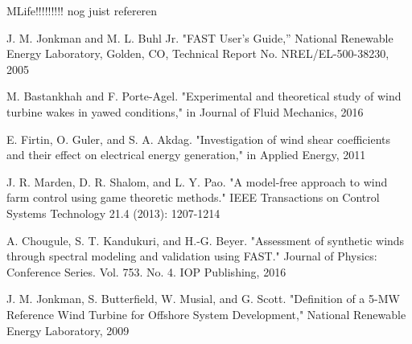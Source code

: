 \begin{thebibliography}{99}
 MLife!!!!!!!!! nog juist refereren

J. M. Jonkman and M. L. Buhl Jr. "FAST User's Guide,'' National Renewable Energy Laboratory, Golden, CO, Technical Report No. NREL/EL-500-38230, 2005

M. Bastankhah and F. Porte-Agel. "Experimental and theoretical study of wind turbine wakes in yawed conditions," in Journal of Fluid Mechanics, 2016

E. Firtin, O. Guler, and S. A. Akdag. "Investigation of wind shear coefficients and their effect on electrical energy generation," in Applied Energy, 2011

J. R. Marden, D. R. Shalom, and L. Y. Pao. "A model-free approach to wind farm control using game theoretic methods." IEEE Transactions on Control Systems Technology 21.4 (2013): 1207-1214	

A. Chougule, S. T. Kandukuri, and H.-G. Beyer. "Assessment of synthetic winds through spectral modeling and validation using FAST." Journal of Physics: Conference Series. Vol. 753. No. 4. IOP Publishing, 2016

J. M. Jonkman, S. Butterfield, W. Musial, and G. Scott. "Definition of a 5-MW Reference	Wind Turbine for Offshore System Development," National Renewable Energy Laboratory, 2009







\end{thebibliography}